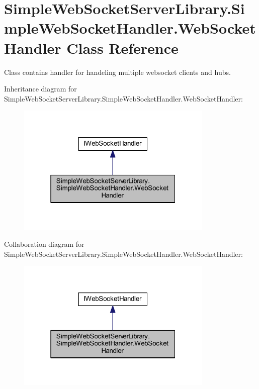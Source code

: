 \hypertarget{class_simple_web_socket_server_library_1_1_simple_web_socket_handler_1_1_web_socket_handler}{}\section{Simple\+Web\+Socket\+Server\+Library.\+Simple\+Web\+Socket\+Handler.\+Web\+Socket\+Handler Class Reference}
\label{class_simple_web_socket_server_library_1_1_simple_web_socket_handler_1_1_web_socket_handler}


Class contains handler for handeling multiple websocket clients and hubs.  




Inheritance diagram for Simple\+Web\+Socket\+Server\+Library.\+Simple\+Web\+Socket\+Handler.\+Web\+Socket\+Handler\+:
\nopagebreak
\begin{figure}[H]
\begin{center}
\leavevmode
\includegraphics[width=265pt]{class_simple_web_socket_server_library_1_1_simple_web_socket_handler_1_1_web_socket_handler__inherit__graph}
\end{center}
\end{figure}


Collaboration diagram for Simple\+Web\+Socket\+Server\+Library.\+Simple\+Web\+Socket\+Handler.\+Web\+Socket\+Handler\+:
\nopagebreak
\begin{figure}[H]
\begin{center}
\leavevmode
\includegraphics[width=265pt]{class_simple_web_socket_server_library_1_1_simple_web_socket_handler_1_1_web_socket_handler__coll__graph}
\end{center}
\end{figure}
